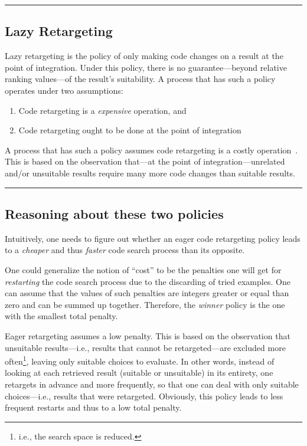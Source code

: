 \fancybreak{\pfbreakdisplay}

\subsection{Lazy Retargeting}

Lazy retargeting is the policy of only making code changes on a result at the point of integration. Under this policy, there is no guarantee---beyond relative ranking values---of the result's suitability. A process that has such a policy operates under two assumptions:

\begin{enumerate}
	\item Code retargeting is a \emph{expensive} operation, and
	\item Code retargeting ought to be done at the point of integration
\end{enumerate}

A process that has such a policy assumes code retargeting is a costly operation~\cite{Brandt:2009ew, Wightman:2012gc}. This is based on the observation that---at the point of integration---unrelated and/or unsuitable results require many more code changes than suitable results.

\fancybreak{\pfbreakdisplay}

\subsection{Reasoning about these two policies}

Intuitively, one needs to figure out whether an eager code retargeting policy leads to a \emph{cheaper} and thus \emph{faster} code search process than its opposite. 

One could generalize the notion of ``cost'' to be the penalties one will get for \emph{restarting} the code search process due to the discarding of tried examples. One can assume that the values of such penalties are integers greater or equal than zero and can be summed up together. Therefore, the \emph{winner} policy is the one with the smallest total penalty.

Eager retargeting assumes a low penalty. This is based on the observation that unsuitable results---i.e., results that cannot be retargeted---are excluded more often\footnote{i.e., the search space is reduced.}, leaving only suitable choices to evaluate. In other words, instead of looking at each retrieved result (suitable or unsuitable) in its entirety, one retargets in advance and more frequently, so that one can deal with only suitable choices---i.e., results that were retargeted. Obviously, this policy leads to less frequent restarts and thus to a low total penalty.

